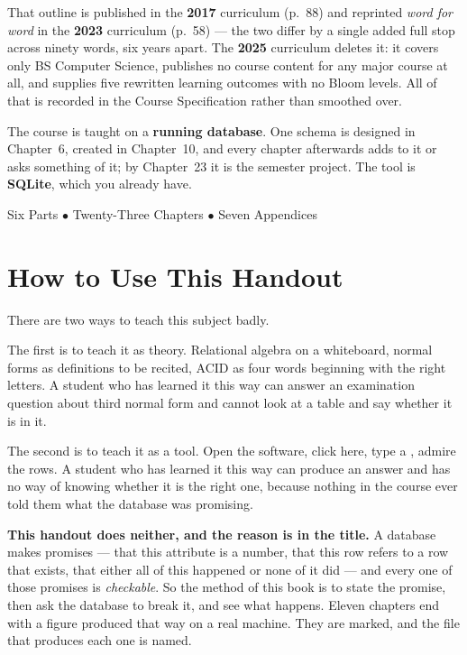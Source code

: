 \begin{center}
\begin{tcolorbox}[enhanced, width=0.86\textwidth, colback=lightbg,
  colframe=primary, boxrule=0pt, leftrule=4pt, arc=2pt, top=6pt, bottom=6pt]
\smallskip
That outline is published in the \textbf{2017} curriculum (p.~88) and
reprinted \emph{word for word} in the \textbf{2023} curriculum (p.~58) --- the
two differ by a single added full stop across ninety words, six years apart.
The \textbf{2025} curriculum deletes it: it covers only BS Computer Science,
publishes no course content for any major course at all, and supplies five
rewritten learning outcomes with no Bloom levels. All of that is recorded in
the Course Specification rather than smoothed over.

\smallskip
The course is taught on a \textbf{running database}. One schema is designed in
Chapter~6, created in Chapter~10, and every chapter afterwards adds to it or
asks something of it; by Chapter~23 it is the semester project. The tool is
\textbf{SQLite}, which you already have.
\end{tcolorbox}

\vspace{0.9cm}
{\small\color{gray!60!black}Six Parts $\bullet$ Twenty-Three Chapters $\bullet$ Seven Appendices}
\vspace{1cm}
\end{center}

\newpage

\chapter*{How to Use This Handout}

There are two ways to teach this subject badly.

The first is to teach it as theory. Relational algebra on a whiteboard,
normal forms as definitions to be recited, ACID as four words beginning with
the right letters. A student who has learned it this way can answer an
examination question about third normal form and cannot look at a table and
say whether it is in it.

The second is to teach it as a tool. Open the software, click here, type a
, admire the rows. A student who has learned it this way can
produce an answer and has no way of knowing whether it is the right one,
because nothing in the course ever told them what the database was promising.

\textbf{This handout does neither, and the reason is in the title.} A database
makes promises --- that this attribute is a number, that this row refers to a
row that exists, that either all of this happened or none of it did --- and
every one of those promises is \emph{checkable}. So the method of this book is
to state the promise, then ask the database to break it, and see what happens.
Eleven chapters end with a figure produced that way on a real machine. They
are marked, and the file that produces each one is named.

